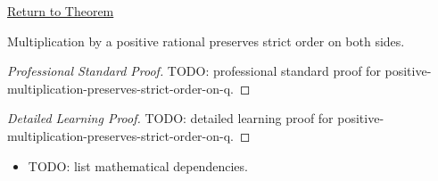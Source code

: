\newpage
{}
\label{prf:positive-multiplication-preserves-strict-order-on-q}

\begin{remark*}[Return]
\hyperref[thm:positive-multiplication-preserves-strict-order-on-q]{Return to Theorem}
\end{remark*}

\begin{theorem*}
Multiplication by a positive rational preserves strict order on both sides.
\end{theorem*}

\begin{proof}[Professional Standard Proof]
\LRAProofBodyStart
TODO: professional standard proof for positive-multiplication-preserves-strict-order-on-q.
\end{proof}

\begin{proof}[Detailed Learning Proof]
\LRAProofBodyStart
TODO: detailed learning proof for positive-multiplication-preserves-strict-order-on-q.
\end{proof}

\begin{remark*}
\end{remark*}

\begin{dependencies}
\begin{itemize}
  \item TODO: list mathematical dependencies.
\end{itemize}
\end{dependencies}

\clearpage
